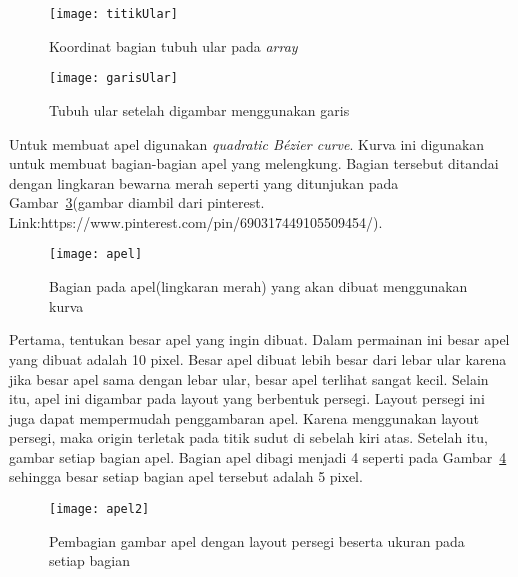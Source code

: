 \begin{figure}[H]
	\centering  
	\texttt{[image: titikUlar]}  
	\caption[Koordinat bagian tubuh ular pada \textit{array}]{Koordinat bagian tubuh ular pada \textit{array}}
	\label{fig:titikUlar} 
\end{figure}

\begin{figure}[H]
	\centering  
	\texttt{[image: garisUlar]}  
	\caption[Tubuh ular setelah digambar menggunakan garis]{Tubuh ular setelah digambar menggunakan garis}
	\label{fig:garisUlar} 
\end{figure}

Untuk membuat apel digunakan \textit{quadratic B\'ezier curve}. Kurva ini digunakan untuk membuat bagian-bagian apel yang melengkung. Bagian tersebut ditandai dengan lingkaran bewarna merah seperti yang ditunjukan pada Gambar~\ref{fig:apel}(gambar diambil dari pinterest. Link:https://www.pinterest.com/pin/690317449105509454/).

\begin{figure}[H]
	\centering  
	\texttt{[image: apel]}  
	\caption[Bagian pada apel(lingkaran merah) yang akan dibuat menggunakan kurva]{Bagian pada apel(lingkaran merah) yang akan dibuat menggunakan kurva}
	\label{fig:apel} 
\end{figure}

Pertama, tentukan besar apel yang ingin dibuat. Dalam permainan ini besar apel yang dibuat adalah 10 pixel. Besar apel dibuat lebih besar dari lebar ular karena jika besar apel sama dengan lebar ular, besar apel terlihat sangat kecil. Selain itu, apel ini digambar pada layout yang berbentuk persegi. Layout persegi ini juga dapat mempermudah penggambaran apel. Karena menggunakan layout persegi, maka origin terletak pada titik sudut di sebelah kiri atas. Setelah itu, gambar setiap bagian apel. Bagian apel dibagi menjadi 4 seperti pada Gambar~\ref{fig:apel2} sehingga besar setiap bagian apel tersebut adalah 5 pixel. 

\begin{figure}[H]
	\centering  
	\texttt{[image: apel2]}  
	\caption[Pembagian gambar apel dengan layout persegi beserta ukuran pada setiap bagian]{Pembagian gambar apel dengan layout persegi beserta ukuran pada setiap bagian}
	\label{fig:apel2} 
\end{figure}

